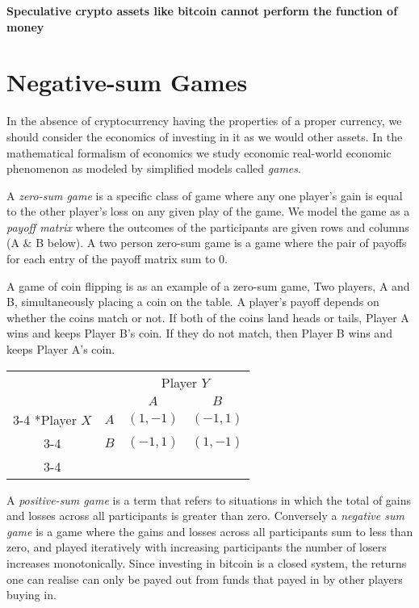 \begin{infobox}
  \textbf{Speculative crypto assets like bitcoin cannot perform the function of
  money}
\end{infobox}

\section{Negative-sum Games}

In the absence of cryptocurrency having the properties of a proper currency, we
should consider the economics of investing in it as we would other assets. In
the mathematical formalism of economics we study economic real-world economic
phenomenon as modeled by simplified models called \textit{games}.

A \textit{zero-sum game} is a specific class of game where any one player's gain
is equal to the other player's loss on any given play of the game. We model the
game as a \textit{payoff matrix} where the outcomes of the participants are given
rows and columns (A \& B below). A two person zero-sum game is a game where the
pair of payoffs for each entry of the payoff matrix sum to 0.

A game of coin flipping is as an example of a zero-sum game, Two players, A and
B, simultaneously placing a coin on the table. A player's payoff depends on
whether the coins match or not. If both of the coins land heads or tails, Player
A wins and keeps Player B's coin. If they do not match, then Player B wins and
keeps Player A’s coin.

\begin{table}
  \setlength{\extrarowheight}{2pt}
  \begin{tabular}{cc|c|c|}
    & \multicolumn{1}{c}{} & \multicolumn{2}{c}{Player $Y$}\\
    & \multicolumn{1}{c}{} & \multicolumn{1}{c}{$A$}  & \multicolumn{1}{c}{$B$} \\\cline{3-4}
    \multirow{2}*{Player $X$}
    & $A$ & $(1,-1)$ & $(-1,1)$ \\\cline{3-4}
    & $B$ & $(-1,1)$ & $(1,-1)$    \\\cline{3-4}
  \end{tabular}
\end{table}

A \textit{positive-sum game} is a term that refers to situations in which the
total of gains and losses across all participants is greater than zero.
Conversely a \textit{negative sum game} is a game where the gains and losses
across all participants sum to less than zero, and played iteratively with
increasing participants the number of losers increases monotonically.
Since investing in bitcoin is a closed system, the returns one can realise can
only be payed out from funds that payed in by other players buying in.

